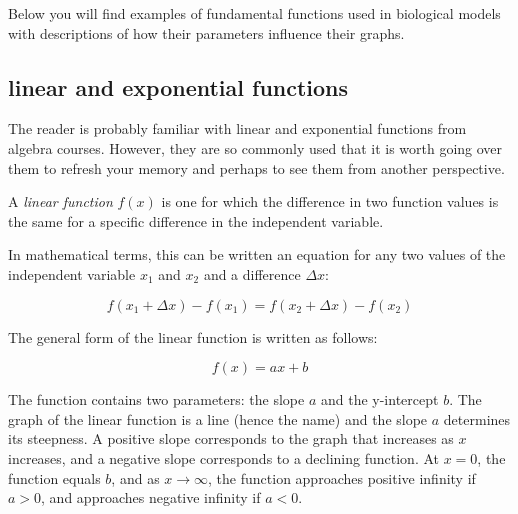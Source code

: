 \documentclass[
  letterpaper,
  DIV=11,
  numbers=noendperiod]{scrreprt}
\begin{document}
Below you will find examples of fundamental functions used in biological
models with descriptions of how their parameters influence their graphs.

\hypertarget{linear-and-exponential-functions}{%
\subsection{linear and exponential
functions}\label{linear-and-exponential-functions}}

The reader is probably familiar with linear and exponential functions
from algebra courses. However, they are so commonly used that it is
worth going over them to refresh your memory and perhaps to see them
from another perspective.

\begin{tcolorbox}[enhanced jigsaw, arc=.35mm, colframe=quarto-callout-note-color-frame, left=2mm, opacitybacktitle=0.6, breakable, title=\textcolor{quarto-callout-note-color}{\faInfo}\hspace{0.5em}{Definition}, toprule=.15mm, coltitle=black, bottomtitle=1mm, toptitle=1mm, colback=white, leftrule=.75mm, colbacktitle=quarto-callout-note-color!10!white, titlerule=0mm, opacityback=0, rightrule=.15mm, bottomrule=.15mm]

A \emph{linear function} \(f(x)\) is one for which the difference in two
function values is the same for a specific difference in the independent
variable.

\end{tcolorbox}

In mathematical terms, this can be written an equation for any two
values of the independent variable \(x_1\) and \(x_2\) and a difference
\(\Delta x\):

\[ f(x_1 + \Delta x) - f(x_1) = f(x_2 + \Delta x) - f(x_2) \]

The general form of the linear function is written as follows:

\begin{equation}
f(x) = ax + b
\label{eq:linear_funk}
\end{equation}

The function contains two parameters: the
 slope \(a\) and the
 y-intercept \(b\). The graph of the
linear function is a line (hence the name) and the slope \(a\)
determines its steepness. A positive slope corresponds to the graph that
increases as \(x\) increases, and a negative slope corresponds to a
declining function. At \(x=0\), the function equals \(b\), and as
\(x \to \infty\), the function approaches positive infinity if \(a>0\),
and approaches negative infinity if \(a<0\).
\end{document}
